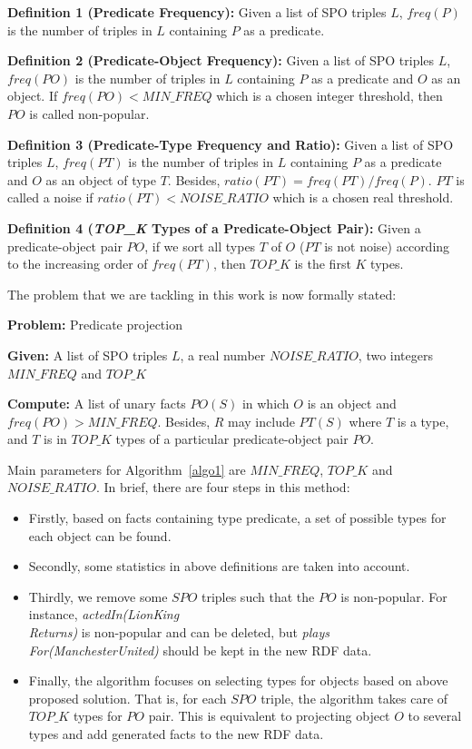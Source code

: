 \documentclass{acm_proc_article-sp}
\begin{document}
\textbf{Definition 1 (Predicate Frequency):} Given a list of SPO triples $L$, $freq(P)$ is the number of triples in $L$ containing $P$ as a predicate.

\textbf{Definition 2 (Predicate-Object Frequency):} Given a list of SPO triples $L$, $freq(PO)$ is the number of triples in $L$ containing $P$ as a predicate and $O$ as an object. If $freq(PO) < MIN\_FREQ$ which is a chosen integer threshold, then $PO$ is called non-popular.

\textbf{Definition 3 (Predicate-Type Frequency and Ratio):} Given a list of SPO triples $L$, $freq(PT)$ is the number of triples in $L$ containing $P$ as a predicate and $O$ as an object of type $T$. Besides, $ratio(PT) = freq(PT) / freq(P)$. $PT$ is called a noise if $ratio(PT) < NOISE\_RATIO$ which is a chosen real threshold.

\textbf{Definition 4 (\textit{TOP\_K} Types of a Predicate-Object Pair):} Given a predicate-object pair $PO$, if we sort all types $T$ of $O$ ($PT$ is not noise) according to the increasing order of $freq(PT)$, then $TOP\_K$ is the first $K$ types.

The problem that we are tackling in this work is now formally stated:

\begin{framed}
\textbf{Problem:} Predicate projection

\textbf{Given:} A list of SPO triples $L$, a real number $NOISE\_RATIO$, two integers $MIN\_FREQ$ and $TOP\_K$

\textbf{Compute:} A list of unary facts $PO(S)$ in which $O$ is an object and $freq(PO) > MIN\_FREQ$. Besides, $R$ may include $PT(S)$ where $T$ is a type, and $T$ is in $TOP\_K$ types of a particular predicate-object pair $PO$.
\end{framed}

Main parameters for Algorithm~\ref{algo1} are $MIN\_FREQ$, $TOP\_K$ and $NOISE\_RATIO$. In brief, there are four steps in this method:
\begin{itemize}
\item Firstly, based on facts containing type predicate, a set of possible types for each object can be found.
\item Secondly, some statistics in above definitions are taken into account.
\item Thirdly, we remove some $SPO$ triples such that the $PO$ is non-popular. For instance, \textit{actedIn(LionKing\\Returns)} is non-popular and can be deleted, but \textit{plays\\For(ManchesterUnited)} should be kept in the new RDF data.
\item Finally, the algorithm focuses on selecting types for objects based on above proposed solution. That is, for each $SPO$ triple, the algorithm takes care of $TOP\_K$ types for $PO$ pair. This is equivalent to projecting object $O$ to several types and add generated facts to the new RDF data.
\end{itemize}
\end{document}
